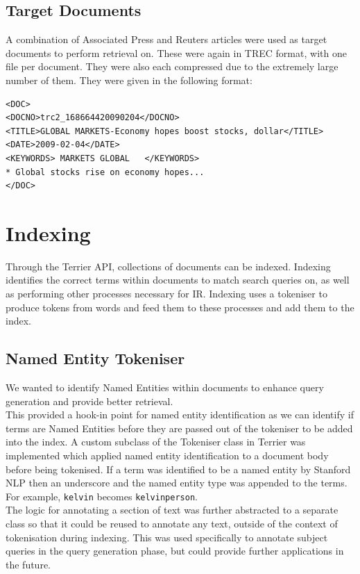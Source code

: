 \documentclass{l4proj}
\newcommand{\code}[1]{\texttt{#1}}
\begin{document}
\subsection{Target Documents}
A combination of Associated Press and Reuters articles were used as target documents to perform retrieval on. These were again in TREC format, with one file per document. They were also each compressed due to the extremely large number of them.
They were given in the following format:
\begin{verbatim}
<DOC>
<DOCNO>trc2_168664420090204</DOCNO>
<TITLE>GLOBAL MARKETS-Economy hopes boost stocks, dollar</TITLE>
<DATE>2009-02-04</DATE>
<KEYWORDS> MARKETS GLOBAL   </KEYWORDS>
* Global stocks rise on economy hopes...
</DOC>
\end{verbatim}
\section{Indexing}
Through the Terrier API, collections of documents can be indexed. Indexing identifies the correct terms within documents to match search queries on, as well as performing other processes necessary for IR. Indexing uses a tokeniser to produce tokens from words and feed them to these processes and add them to the index.
\subsection{Named Entity Tokeniser} \label{nertok}
We wanted to identify Named Entities within documents to enhance query generation and provide better retrieval. \\ 
This provided a hook-in point for named entity identification as we can identify if terms are Named Entities before they are passed out of the tokeniser to be added into the index.
A custom subclass of the Tokeniser class in Terrier was implemented which applied named entity identification to a document body before being tokenised.
If a term was identified to be a named entity by Stanford NLP then an underscore and the named entity type was appended to the terms. For example, 
\code{kelvin} becomes \code{kelvin\textunderscore person}. \\
The logic for annotating a section of text was further abstracted to a separate class so that it could be reused to annotate any text, outside of the context of tokenisation during indexing. This was used specifically to annotate subject queries in the query generation phase, but could provide further applications in the future.
\end{document}
